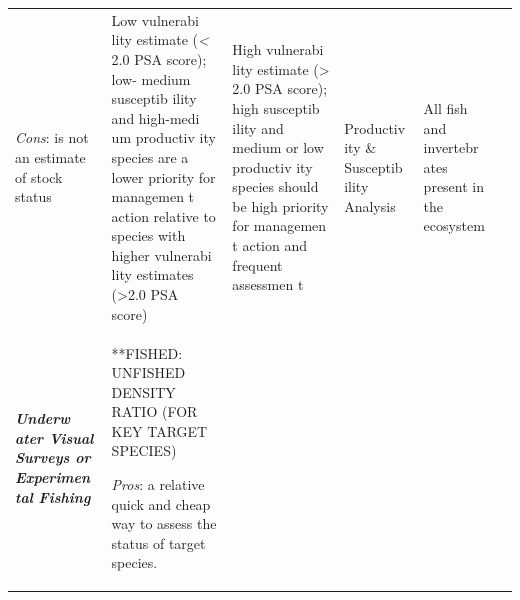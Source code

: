 \documentclass[]{book}
\begin{document}
\begin{longtable}[]{@{}llllll@{}}
\begin{minipage}[t]{0.16\columnwidth}
\emph{Cons}: is not an estimate of stock status\strut
\end{minipage} & \begin{minipage}[t]{0.16\columnwidth}\raggedright\strut
Low vulnerabi lity estimate (\emph{\textless{}} 2.0 PSA score); low-
medium susceptib ility and high-medi um productiv ity species are a
lower priority for managemen t action relative to species with higher
vulnerabi lity estimates (\textgreater{}2.0 PSA score)\strut
\end{minipage} & \begin{minipage}[t]{0.16\columnwidth}\raggedright\strut
High vulnerabi lity estimate (\textgreater{} 2.0 PSA score); high
susceptib ility and medium or low productiv ity species should be high
priority for managemen t action and frequent assessmen t\strut
\end{minipage} & \begin{minipage}[t]{0.16\columnwidth}\raggedright\strut
Productiv ity \& Susceptib ility Analysis\strut
\end{minipage} & \begin{minipage}[t]{0.16\columnwidth}\raggedright\strut
All fish and invertebr ates present in the ecosystem\strut
\end{minipage}\tabularnewline
\begin{minipage}[t]{0.16\columnwidth}\raggedright\strut
\emph{\textbf{Underw ater Visual Surveys or Experimen tal Fishing}
}\strut
\end{minipage} & \begin{minipage}[t]{0.16\columnwidth}\raggedright\strut
**FISHED: UNFISHED DENSITY RATIO (FOR KEY TARGET SPECIES)\emph{ }

\emph{Pros}: a relative quick and cheap way to assess the status of
target species.


\end{minipage}
\end{longtable}
\end{document}
